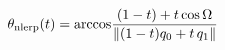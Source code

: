 \documentclass[preview]{standalone}
\begin{document}
\begin{align*}
\special{dvisvgm:raw <g id='unique000'>}\theta_{\mathrm{nlerp}}(t)=\arccos\!\frac{(1-t)+t\cos\Omega}{\lVert(1-t)q_0+t\,q_1\rVert}\special{dvisvgm:raw </g>}
\end{align*}
\end{document}
